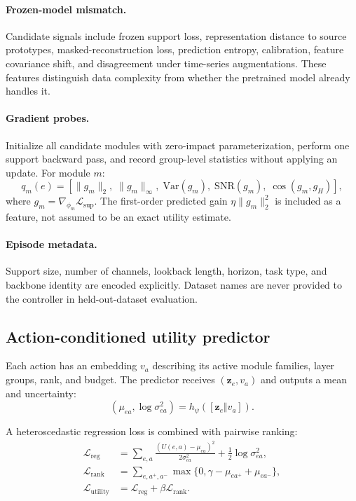 \documentclass[10pt]{article}
\newcommand{\z}{\mathbf{z}}
\newcommand{\Lcal}{\mathcal{L}}
\begin{document}
\paragraph{Frozen-model mismatch.} Candidate signals include frozen support loss, representation distance to source prototypes, masked-reconstruction loss, prediction entropy, calibration, feature covariance shift, and disagreement under time-series augmentations. These features distinguish data complexity from whether the pretrained model already handles it.

\paragraph{Gradient probes.} Initialize all candidate modules with zero-impact parameterization, perform one support backward pass, and record group-level statistics without applying an update. For module $m$:
\begin{equation}
q_m(e)=\left[\|g_m\|_2,\;\|g_m\|_\infty,\;\mathrm{Var}(g_m),\;\mathrm{SNR}(g_m),\;\cos(g_m,g_H)\right],
\end{equation}
where $g_m=\nabla_{\phi_m}\Lcal_{\mathrm{sup}}$. The first-order predicted gain $\eta\|g_m\|_2^2$ is included as a feature, not assumed to be an exact utility estimate.

\paragraph{Episode metadata.} Support size, number of channels, lookback length, horizon, task type, and backbone identity are encoded explicitly. Dataset names are never provided to the controller in held-out-dataset evaluation.

\subsection{Action-conditioned utility predictor}

Each action has an embedding $v_a$ describing its active module families, layer groups, rank, and budget. The predictor receives $(\z_e,v_a)$ and outputs a mean and uncertainty:
\begin{equation}
(\mu_{ea},\log\sigma^2_{ea})=h_{\psi}([\z_e\Vert v_a]).
\end{equation}

A heteroscedastic regression loss is combined with pairwise ranking:
\begin{align}
\Lcal_{\mathrm{reg}}&=\sum_{e,a}\frac{(U(e,a)-\mu_{ea})^2}{2\sigma^2_{ea}}+\frac{1}{2}\log\sigma^2_{ea},\\
\Lcal_{\mathrm{rank}}&=\sum_{e,a^+,a^-}\max\{0,\gamma-\mu_{ea^+}+\mu_{ea^-}\},\\
\Lcal_{\mathrm{utility}}&=\Lcal_{\mathrm{reg}}+\beta\Lcal_{\mathrm{rank}}.
\end{align}
\end{document}
